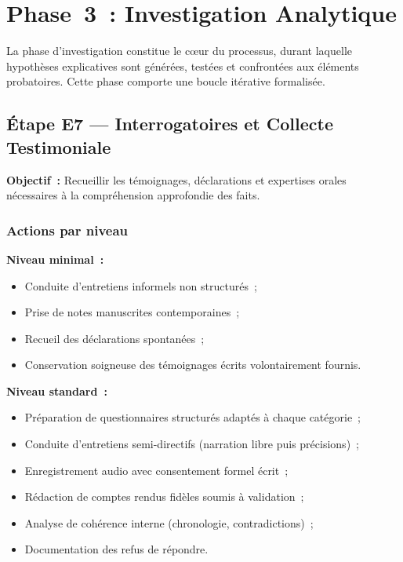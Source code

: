 \section{Phase~3~: Investigation Analytique}
\label{sec:piu-phase3}

La phase d'investigation constitue le c\oe ur du processus, durant laquelle
hypothèses explicatives sont générées, testées et confrontées aux éléments
probatoires. Cette phase comporte une boucle itérative formalisée.

\subsection{Étape E7 --- Interrogatoires et Collecte Testimoniale}

\textbf{Objectif~:} Recueillir les témoignages, déclarations et expertises orales
nécessaires à la compréhension approfondie des faits.

\subsubsection*{Actions par niveau}

\textbf{Niveau minimal~:}
\begin{itemize}
    \item Conduite d'entretiens informels non structurés~;
    \item Prise de notes manuscrites contemporaines~;
    \item Recueil des déclarations spontanées~;
    \item Conservation soigneuse des témoignages écrits volontairement fournis.
\end{itemize}

\textbf{Niveau standard~:}
\begin{itemize}
    \item Préparation de questionnaires structurés adaptés à chaque catégorie~;
    \item Conduite d'entretiens semi-directifs (narration libre puis précisions)~;
    \item Enregistrement audio avec consentement formel écrit~;
    \item Rédaction de comptes rendus fidèles soumis à validation~;
    \item Analyse de cohérence interne (chronologie, contradictions)~;
    \item Documentation des refus de répondre.
\end{itemize}

